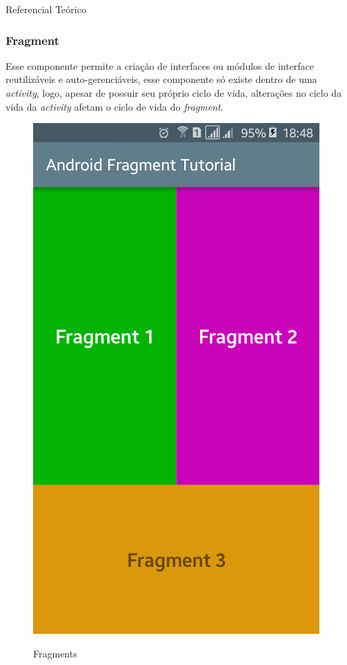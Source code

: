 \documentclass[
	12pt,				%
	openright,			%
	twoside,			%
	a4paper,			%
	english,			%
	french,				%
	spanish,			%
	brazil				%
	]{abntex2}
\begin{document}
\begin{chapter}{Referencial Teórico}
\subsubsection{Fragment} \label{fragment}
Esse componente permite a criação de interfaces ou módulos de interface reutilizáveis e auto-gerenciáveis, esse componente só existe dentro de uma \textit{activity}, logo, apesar de possuir seu próprio ciclo de vida, alterações no ciclo da vida da \textit{activity} afetam o ciclo de vida do \textit{fragment}.  

\begin{figure}[h]
\centering
   \caption{Fragments}
   \includegraphics[scale=0.4]{media/fragments.png}
     \label{fig:fragments_preview}
\end{figure}


\end{chapter}
\end{document}
